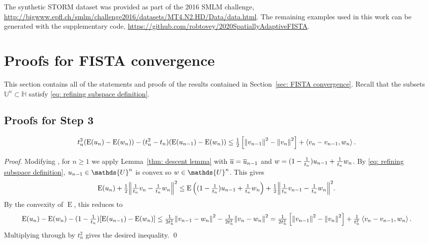 \documentclass[smallextended]{svjour3}
\newenvironment{dataavailability}{\begin{datav}}
	{\end{datav}}
\let\F\mathds\let\C\mathcal\newcommand{\R}{\F{R}}\newcommand{\A}{\tens{A}}
\newcommand{\norm}[1]{{\left\lVert #1 \right\rVert}}
\newcommand{\IP}[2]{\left\langle #1,#2 \right\rangle}
\newcommand{\op}[1]{\operatorname{#1}}
\newcommand{\1}{\F{1}}
\newcommand*{\var}[1]{%
	\IfEqCase{#1}{%
		{0}{u}%
		{1}{v}%
		{2}{w}%
	}[u#1]%
}
\begin{document}
	\begin{dataavailability}
		The synthetic STORM dataset was provided as part of the 2016 SMLM challenge, \url{http://bigwww.epfl.ch/smlm/challenge2016/datasets/MT4.N2.HD/Data/data.html}. The remaining examples used in this work can be generated with the supplementary code, \url{https://github.com/robtovey/2020SpatiallyAdaptiveFISTA}.
	\end{dataavailability}
	
	
	\appendix
	\section{Proofs for FISTA convergence}\label{app: FISTA convergence}
	This section contains all of the statements and proofs of the results contained in Section~\ref{sec: FISTA convergence}. Recall that the subsets $\F{U}^n\subset\F H$ satisfy \eqref{eq: refining subspace definition}.
	
	\subsection{Proofs for Step 3}
	
	\begin{theorem}\label{app:thm: one step FISTA}
		\begin{equation}
			t_{n}^2(\op{E}(\var0_{n}) - \op{E}(\var2_n)) - (t_{n}^2-t_{n})(\op{E}(\var0_{n-1})-\op{E}(\var2_n)) \leq \tfrac1{2}\left[\norm{\var1_{n-1}}^2-\norm{\var1_{n}}^2\right] + \IP{\var1_{n}-\var1_{n-1}}{\var2_n}.
			\label{app:eq: one-step FISTA}
		\end{equation}
	\end{theorem}
	\begin{proof}
		Modifying \cite[Thm 3.2]{Chambolle2015}, for $n\geq1$ we apply Lemma~\ref{thm: descent lemma} with $\bar{\var0} = \bar{\var0}_{n-1}$ and $\var2 = (1-\frac{1}{t_{n}})\var0_{n-1} + \frac{1}{t_{n}}\var2_n$. By \eqref{eq: refining subspace definition}, $\var0_{n-1}\in\F{U}^n$ is convex so $\var2\in \F{U}^n$. This gives
		\begin{equation}
			\op{E}(\var0_{n}) + \tfrac12\norm{\tfrac{1}{t_{n}}\var1_{n}-\tfrac{1}{t_{n}}\var2_n}^2 \leq \op{E}\left((1-\tfrac{1}{t_{n}})\var0_{n-1}+\tfrac{1}{t_{n}}\var2_n\right) + \tfrac12\norm{\tfrac{1}{t_{n}}\var1_{n-1}-\tfrac{1}{t_{n}}\var2_n}^2.
		\end{equation}
		By the convexity of $\op{E}$, this reduces to
		\begin{equation}
			\op{E}(\var0_{n}) - \op{E}(\var2_n) - (1-\tfrac{1}{t_{n}})[\op{E}(\var0_{n-1})-\op{E}(\var2_n)] \leq \tfrac1{2t_{n}^2}\norm{\var1_{n-1}-\var2_n}^2 - \tfrac1{2t_{n}^2}\norm{\var1_{n}-\var2_n}^2 = \tfrac1{2t_{n}^2}\left[\norm{\var1_{n-1}}^2-\norm{\var1_{n}}^2\right] + \tfrac1{t_{n}^2}\IP{\var1_{n}-\var1_{n-1}}{\var2_n}.
		\end{equation}
		Multiplying through by $t_n^2$ gives the desired inequality.
		\qed\end{proof}
	
\end{document}
